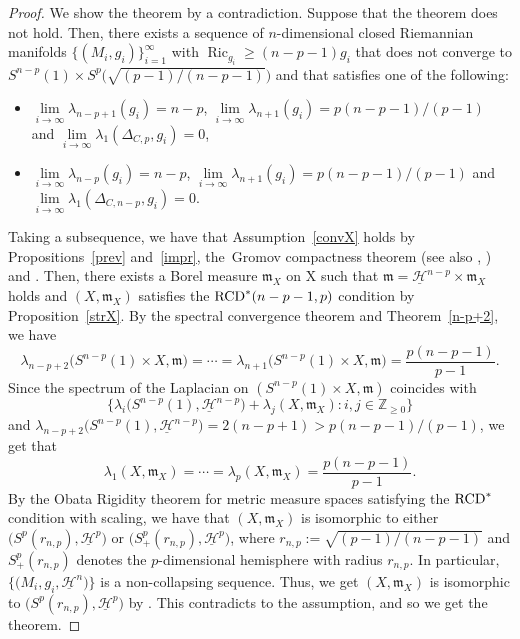 \documentclass[pdftex]{sigma}
\numberwithin{equation}{section}
\theoremstyle{definition}
\newcommand{\Ric}{\operatorname{Ric}}
\newcommand{\mf}{\mathfrak{m}}
\newcommand{\RCD}{{\rm RCD}^\ast}
\newcommand{\nHa}{\underline{\mathcal{H}}}
\begin{document}
\begin{proof}
We show the theorem by a contradiction.
Suppose that the theorem does not hold.
Then, there exists a sequence of $n$-dimensional closed Riemannian manifolds $\{(M_i,g_i)\}_{i=1}^\infty$ with $\Ric_{g_i}\geq (n-p-1)g_i$ that does not converge to $S^{n-p}(1)\times S^p\big(\sqrt{(p-1)/(n-p-1)}\big)$ and that satisfies one of the following:
\begin{itemize}\itemsep=0pt
\item $\lim\limits_{i\to\infty}\lambda_{n-p+1}(g_i)=n-p$, $\lim\limits_{i\to\infty}\lambda_{n+1}(g_i)=p(n-p-1)/(p-1)$ and $\lim\limits_{i\to \infty}\lambda_1(\Delta_{C,p},g_i)=0$,
\item $\lim\limits_{i\to\infty}\lambda_{n-p}(g_i)=n-p$, $\lim\limits_{i\to\infty}\lambda_{n+1}(g_i)=p(n-p-1)/(p-1)$ and  $\lim\limits_{i\to \infty}\lambda_1(\Delta_{C,n-p},g_i)=0$.
\end{itemize}
Taking a subsequence, we have that Assumption~\ref{convX} holds by Propositions~\ref{prev} and~\ref{impr}, the~Gromov compactness theorem (see also \cite[Theorem~11.1.10]{Pe3}, \cite[Theorem~4.54]{Ai3}) and \cite[Theorems~1.6 and~1.10]{CC1}.
Then, there exists a Borel measure $\mf_X$ on X such that $\mf=\nHa^{n-p}\times \mf_X$ holds and $(X,\mf_X)$ satisfies the $\RCD(n-p-1,p)$ condition by Proposition~\ref{strX}.
By the spectral convergence theorem \cite[Theorem~7.9]{CC3} and Theorem~\ref{n-p+2}, we have
\[
\lambda_{n-p+2}\big(S^{n-p}(1)\times X, \mf\big)=\cdots=\lambda_{n+1}\big(S^{n-p}(1)\times X, \mf\big)= \frac{p(n-p-1)}{p-1}.
\]
Since the spectrum of the Laplacian on $(S^{n-p}(1)\times X,\mf)$ coincides with
\[
\big\{\lambda_i\big(S^{n-p}(1),\nHa^{n-p}\big)+\lambda_j(X,\mf_X)\colon i,j\in\mathbb{Z}_{\geq 0}\big\}
\]
and $\lambda_{n-p+2}\big(S^{n-p}(1),\nHa^{n-p}\big)=2(n-p+1)>p(n-p-1)/(p-1)$,
we get that
\[
\lambda_1(X,\mf_X)=\cdots =\lambda_p(X,\mf_X)=\frac{p(n-p-1)}{p-1}.
\]
By the Obata Rigidity theorem for metric measure spaces satisfying the $\RCD$ condition \cite[Theorem~1.4]{Ket2} with scaling, we have that $(X,\mf_X)$ is isomorphic to either $\big(S^p(r_{n,p}),\nHa^{p}\big)$ or $\big(S^p_+(r_{n,p}),\nHa^{p}\big)$, where
$r_{n,p}:= \sqrt{(p-1)/(n-p-1)}$ and
 $S^p_+(r_{n,p})$ denotes the $p$-dimensional hemisphere with radius $r_{n,p}$.
In particular, $\big\{\big(M_i,g_i, \nHa^n\big)\big\}$ is a non-collapsing sequence.
Thus, we get $(X,\mf_X)$ is isomorphic to $\big(S^p(r_{n,p}),\nHa^{p}\big)$ by \cite[Theorem~6.2]{CC1}.
This contradicts to the assumption, and so we get the theorem.
\end{proof}
\end{document}
